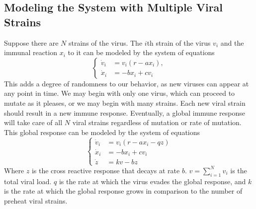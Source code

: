 \documentclass{article}
\begin{document}
\subsection{Modeling the System with Multiple Viral Strains}
Suppose there are $N$ strains of the virus.  The $i$th strain of the virus $v_i$ and the immunal reaction $x_i$ to it can be modeled by the system of equations
\begin{equation}
    \begin{cases}
        \dot v_i &= v_i(r - ax_i), \\
        \dot x_i &= -bx_i + cv_i
    \end{cases}
\end{equation}
This adds a degree of randomness to our behavior, as new viruses can appear at any point in time. We may begin with only one virus, which can proceed to mutate as it pleases, or we may begin with many strains. Each new viral strain should result in a new immune response. Eventually, a global immune response will take care of all $N$ viral strains regardless of mutation or rate of mutation. This global response can be modeled by the system of equations
\begin{equation}
    \begin{cases}
        \dot v_i &= v_i(r - ax_i - qz) \\
        \dot x_i &= -bx_i + cv_i \\
        \dot z &= kv - bz
    \end{cases}
\end{equation}
Where $z$ is the cross reactive response that decays at rate $b$.  $v = \sum^{N}_{i=1} v_i$ is the total viral load. $q$ is the rate at which the virus evades the global response, and $k$ is the rate at which the global response grows in comparison to the number of preheat viral strains.
\end{document}
